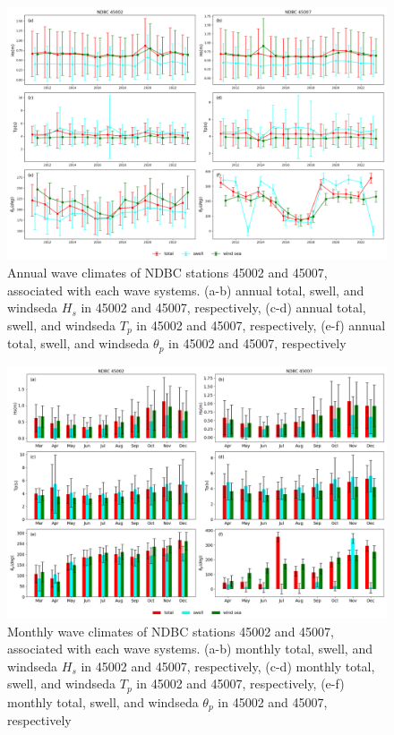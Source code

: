 \begin{figure}[htbp]
  \centering
  \includegraphics[width=1\textwidth]{chapter4/resources/ndbc_annual.png}
  \caption{Annual wave climates of NDBC stations 45002 and 45007, associated
  with each wave systems. (a-b) annual total, swell, and windseda $H_s$ in 45002
  and 45007, respectively, (c-d) annual total, swell, and windseda $T_p$ in
  45002 and 45007, respectively, (e-f) annual total, swell, and windseda
  $\theta_p$ in 45002 and 45007, respectively }
  \label{fig:ndbc_annual}
\end{figure}

\begin{figure}[htbp]
  \centering
  \includegraphics[width=1\textwidth]{chapter4/resources/ndbc_month.png}
  \caption{Monthly wave climates of NDBC stations 45002 and 45007, associated
  with each wave systems. (a-b) monthly total, swell, and windseda $H_s$ in 45002
  and 45007, respectively, (c-d) monthly total, swell, and windseda $T_p$ in
  45002 and 45007, respectively, (e-f) monthly total, swell, and windseda
  $\theta_p$ in 45002 and 45007, respectively }
  \label{fig:ndbc_month}
\end{figure}

